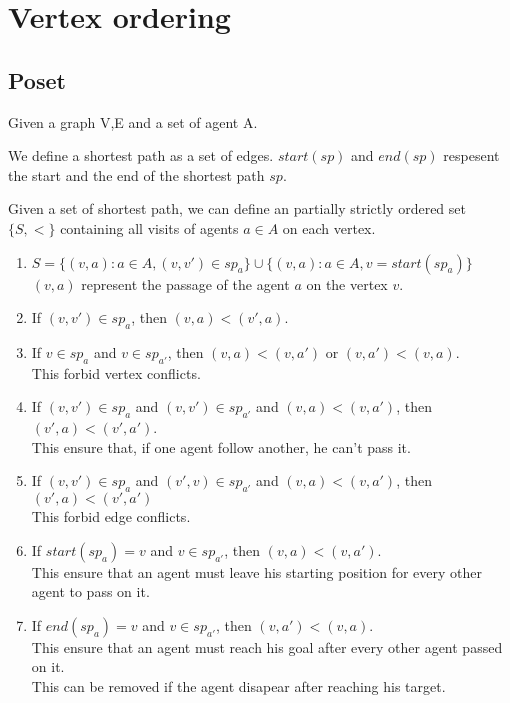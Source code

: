 \section{Vertex ordering}\label{sec:vo}

\subsection{Poset}

Given a graph {V,E} and a set of agent {A}.

We define a shortest path as a set of edges. 
$start(sp)$ and $end(sp)$ respesent the start and the end of the shortest path $sp$.

Given a set of shortest path, we can define an partially strictly ordered set $\{S,<\}$
containing all visits of agents $a \in A$ on each vertex.

\begin{enumerate}
  \item $S = \{(v,a) : a \in A, (v,v') \in sp_a\} \cup \{(v,a) : a \in A, v=start(sp_a)\}$
  \\ $(v,a)$ represent the passage of the agent $a$ on the vertex $v$.
  \item If $(v,v') \in sp_a$, then $(v,a)<(v',a)$.\label{succ}
  \item If $v \in sp_a$ and $v \in sp_{a'}$, then $(v,a)<(v,a')$ or $(v,a')<(v,a)$.
  \\ This forbid vertex conflicts.\label{vercon}
  \item If $(v,v') \in sp_a$ and $(v,v') \in sp_{a'}$ and $(v,a)<(v,a')$, then $(v',a)<(v',a')$.
  \\ This ensure that, if one agent follow another, he can't pass it.
  \item If $(v,v') \in sp_a$ and $(v',v) \in sp_{a'}$ and $(v,a)<(v,a')$, then $(v',a)<(v',a')$
  \\ This forbid edge conflicts.\label{edgcon}
  \item If $start(sp_a)=v$ and $v \in sp_{a'}$, then $(v,a)<(v,a')$.
  \\ This ensure that an agent must leave his starting position for every other agent to pass on it.
  \item If $end(sp_a)=v$ and $v \in sp_{a'}$, then $(v,a')<(v,a)$.
  \\ This ensure that an agent must reach his goal after every other agent passed on it.
  \\ This can be removed if the agent disapear after reaching his target.
\end{enumerate}

